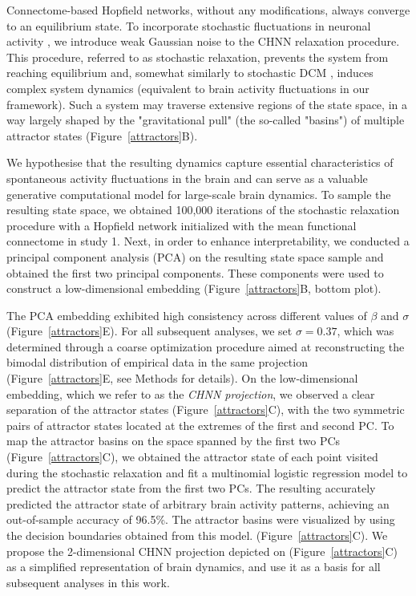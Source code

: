 \documentclass{article}
\begin{document}
Connectome-based Hopfield networks, without any modifications, always converge to an equilibrium state.
To incorporate stochastic fluctuations in neuronal activity \citep{robinson2005multiscale}, we introduce weak
Gaussian noise to the CHNN relaxation procedure. This procedure, referred to as stochastic relaxation, prevents the
system from reaching equilibrium and, somewhat similarly to stochastic DCM \citep{daunizeau2012stochastic}, induces
complex system dynamics  (equivalent to brain activity fluctuations in our framework). Such a system may traverse extensive
regions of the state space, in a way largely shaped by the "gravitational pull" (the so-called "basins") of multiple attractor states (Figure~\ref{attractors}B).

We hypothesise that the resulting dynamics capture essential characteristics of spontaneous activity fluctuations in
the brain and can serve as a valuable generative computational model for large-scale brain dynamics. To sample the
resulting state space, we obtained 100,000 iterations of the stochastic relaxation procedure with a Hopfield network
initialized with the mean functional connectome in study 1. Next, in order to enhance interpretability, we conducted a
principal component analysis (PCA) on the resulting state space sample and obtained the first two principal components.
These components were used to construct a low-dimensional embedding (Figure~\ref{attractors}B, bottom plot).

The PCA embedding exhibited high consistency across different values of $\beta$ and $\sigma$ (Figure~\ref{attractors}E).
For all subsequent analyses, we set $\sigma=0.37$, which was determined through a coarse optimization procedure aimed
at reconstructing the bimodal distribution of empirical data in the same projection (Figure~\ref{attractors}E,
see Methods for details). On the low-dimensional embedding, which we refer to as the \textit{CHNN projection}, we observed
a clear separation of the attractor states (Figure~\ref{attractors}C), with the two symmetric pairs of attractor states
located at the extremes of the first and second PC. To map the attractor basins on the space spanned by the first two
PCs (Figure~\ref{attractors}C), we obtained the attractor state of each point visited during the stochastic relaxation
and fit a multinomial logistic regression model to predict the attractor state from the first two PCs. The resulting
accurately predicted the attractor state of arbitrary brain activity patterns,
achieving an out-of-sample accuracy of 96.5\%. The attractor basins were
visualized by using the decision boundaries obtained from this model. (Figure~\ref{attractors}C). We propose the 2-dimensional CHNN
projection depicted on (Figure~\ref{attractors}C) as a simplified representation of brain dynamics, and use it as a basis
for all subsequent analyses in this work.
\end{document}
